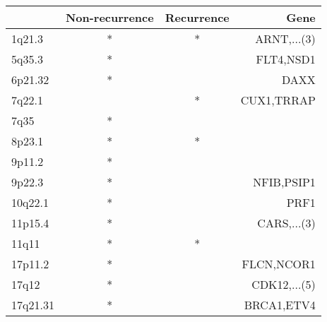 \begin{tabular}{lccr}
\toprule
{} & Non-recurrence & Recurrence &          Gene \\
\midrule
1q21.3   &              * &          * &   ARNT,...(3) \\
5q35.3   &              * &            &     FLT4,NSD1 \\
6p21.32  &              * &            &          DAXX \\
7q22.1   &                &          * &    CUX1,TRRAP \\
7q35     &              * &            &               \\
8p23.1   &              * &          * &               \\
9p11.2   &              * &            &               \\
9p22.3   &              * &            &    NFIB,PSIP1 \\
10q22.1  &              * &            &          PRF1 \\
11p15.4  &              * &            &   CARS,...(3) \\
11q11    &              * &          * &               \\
17p11.2  &              * &            &    FLCN,NCOR1 \\
17q12    &              * &            &  CDK12,...(5) \\
17q21.31 &              * &            &    BRCA1,ETV4 \\
\bottomrule
\end{tabular}
